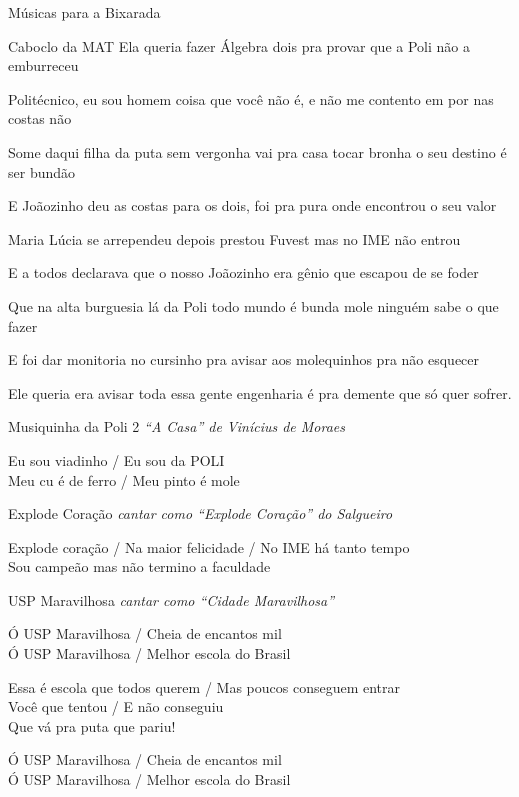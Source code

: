 \begin{secao}{Músicas para a Bixarada}
\begin{subsecao}{Caboclo da MAT}
Ela queria fazer Álgebra dois pra provar que a Poli não a emburreceu

Politécnico, eu sou homem coisa que você não é, e não me contento em por nas
costas não

Some daqui filha da puta sem vergonha vai pra casa tocar bronha o seu destino é
ser bundão

E Joãozinho deu as costas para os dois, foi pra pura onde encontrou o seu valor

Maria Lúcia se arrependeu depois prestou Fuvest mas no IME não entrou

E a todos declarava que o nosso Joãozinho era gênio que escapou de se foder

Que na alta burguesia lá da Poli todo mundo é bunda mole ninguém sabe o que
fazer

E foi dar monitoria no cursinho pra avisar aos molequinhos pra não esquecer

Ele queria era avisar toda essa gente engenharia é pra demente que só quer
sofrer.
\end{subsecao}

\begin{subsecao}{Musiquinha da Poli 2}
{\em ``A Casa'' de Vinícius de Moraes}

Eu sou viadinho / Eu sou da POLI \\
Meu cu é de ferro / Meu pinto é mole
\end{subsecao}

\begin{subsecao}{Explode Coração}
{\em cantar como ``Explode Coração'' do Salgueiro}

Explode coração / Na maior felicidade / No IME há tanto tempo \\
Sou campeão mas não termino a faculdade
\end{subsecao}

\begin{subsecao}{USP Maravilhosa}
{\em cantar como ``Cidade Maravilhosa''}

Ó USP Maravilhosa / Cheia de encantos mil \\
Ó USP Maravilhosa / Melhor escola do Brasil

Essa é escola que todos querem / Mas poucos conseguem entrar \\
Você que tentou / E não conseguiu \\
Que vá pra puta que pariu!

Ó USP Maravilhosa / Cheia de encantos mil \\
Ó USP Maravilhosa / Melhor escola do Brasil
\end{subsecao}


\end{secao}
